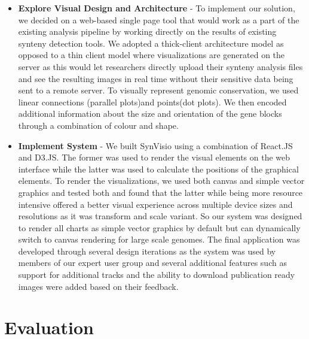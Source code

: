 \begin{itemize}
    \item \textbf{Explore Visual Design and Architecture} - 
    To implement our solution, we decided on a web-based single page tool that would work as a part of the existing analysis pipeline by working directly on the results of existing synteny detection tools. We adopted a thick-client architecture model as opposed to a thin client model where visualizations are generated on the server as this would let researchers directly upload their synteny analysis files and see the resulting images in real time without their sensitive data being sent to a remote server. To visually represent genomic conservation, we used linear connections (parallel plots)and points(dot plots). We then encoded additional information about the size and orientation of the gene blocks through a combination of colour and shape.
   
   \item \textbf{Implement System} - We built SynVisio using a combination of React.JS\cite{react} and D3.JS\cite{d3js}. The former was used to render the visual elements on the web interface while the latter was used to calculate the positions of the graphical elements. To render the visualizations, we used both canvas and simple vector graphics and tested both and found that the latter while being more resource intensive offered a better visual experience across multiple device sizes and resolutions as it was transform and scale variant. So our system was designed to render all charts as simple vector graphics by default but can dynamically switch to canvas rendering for large scale genomes. The final application was developed through several design iterations as the system was used by members of our expert user group and several additional features such as support for additional tracks and the ability to download publication ready images were added based on their feedback. 

\end{itemize}

\section{Evaluation}

